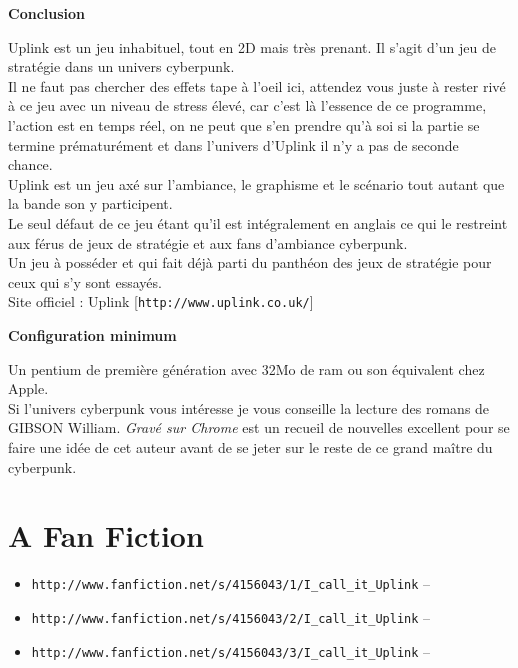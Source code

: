 \documentclass[11pt,twoside,a4paper]{book}
\begin{document}
\begin{multicols*}{2}
\begin{center}
	\textbf{\Large Conclusion}
\end{center}

Uplink est un jeu inhabituel, tout en 2D mais tr{\`e}s prenant. Il s'agit d'un jeu de strat{\'e}gie dans un univers cyberpunk.~\\
Il ne faut pas chercher des effets tape {\`a} l'oeil ici, attendez vous juste {\`a} rester riv{\'e} {\`a} ce jeu avec un niveau de stress {\'e}lev{\'e}, car c'est l{\`a} l'essence de ce programme, l'action est en temps r{\'e}el, on ne peut que s'en prendre qu'{\`a} soi si la partie se termine pr{\'e}matur{\'e}ment et dans l'univers d'Uplink il n'y a pas de seconde chance.~\\
Uplink est un jeu ax{\'e} sur l'ambiance, le graphisme et le sc{\'e}nario tout autant que la bande son y participent.~\\
Le seul d{\'e}faut de ce jeu {\'e}tant qu'il est int{\'e}gralement en anglais ce qui le restreint aux f{\'e}rus de jeux de strat{\'e}gie et aux fans d'ambiance cyberpunk.~\\
Un jeu {\`a} poss{\'e}der et qui fait d{\'e}j{\`a} parti du panth{\'e}on des jeux de strat{\'e}gie pour ceux qui s'y sont essay{\'e}s.~\\
Site officiel : Uplink [\texttt{http://www.uplink.co.uk/}]~\\

\begin{center}
	\textbf{\Large Configuration minimum}
\end{center}

Un pentium de premi{\`e}re g{\'e}n{\'e}ration avec 32Mo de ram ou son {\'e}quivalent chez Apple.~\\

Si l'univers cyberpunk vous int{\'e}resse je vous conseille la lecture des romans de GIBSON William. \emph{Grav{\'e} sur Chrome} est un recueil de nouvelles excellent pour se faire une id{\'e}e de cet auteur avant de se jeter sur le reste de ce grand ma{\^i}tre du cyberpunk.~\\

\end{multicols*}

\clearpage

\section{A Fan Fiction}

\begin{itemize}
	\setlength{\itemsep}{1pt}
	\setlength{\parskip}{0pt}
	\setlength{\parsep}{0pt}
	\item \texttt{http://www.fanfiction.net/s/4156043/1/I\_call\_it\_Uplink} -- 
	\item \texttt{http://www.fanfiction.net/s/4156043/2/I\_call\_it\_Uplink} -- 
	\item \texttt{http://www.fanfiction.net/s/4156043/3/I\_call\_it\_Uplink} -- 
\end{itemize}
\end{document}
